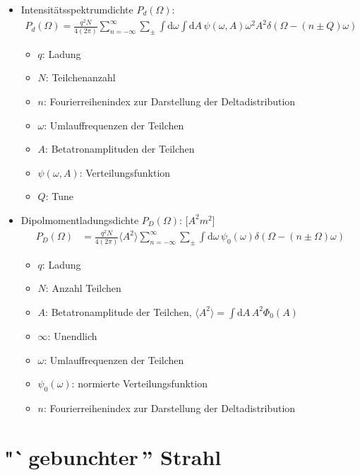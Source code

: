 \documentclass[12pt]{article}%
\begin{document}
\begin{itemize}
\item Intensitätsspektrumdichte $P_d(\Omega)$:
\begin{align}
	P_d(\Omega) =\frac{q^2N}{4(2\pi)}\sum_{n=-\infty}^{\infty}\sum_{\pm} \int \mathrm{d}\omega \int \mathrm{d}A \, \psi(\omega, A) \omega^2 A^2 \delta(\Omega - (n \pm Q)\omega)
\end{align}

	\begin{itemize}
		\item $q$: Ladung
		\item $N$: Teilchenanzahl
		\item $n$: Fourierreihenindex zur Darstellung der Deltadistribution
		\item $\omega$: Umlauffrequenzen der Teilchen
		\item $A$: Betatronamplituden der Teilchen
		\item $\psi(\omega, A)$: Verteilungsfunktion
		\item $Q$: Tune
	\end{itemize}

\item Dipolmomentladungsdichte $P_D(\Omega)$: [$A^2m^2$]
\begin{align}
P_D(\Omega) &= \frac{q^2N}{4(2\pi)} \langle A^2 \rangle \sum_{n=-\infty}^{\infty} \sum_{\pm} \int \mathrm{d}\omega \, \psi_0(\omega) \delta(\Omega - ( n \pm  \Omega) \omega)
\end{align}

	\begin{itemize}
	\item $q$: Ladung
	\item $N$: Anzahl Teilchen
	\item $A$: Betatronamplitude der Teilchen, $\langle A^2 \rangle = \int \mathrm{d}A \, A^2 \Phi_0(A)$
	\item $\infty$: Unendlich
	\item $\omega$: Umlauffrequenzen der Teilchen
	\item $\psi_0(\omega)$: normierte Verteilungsfunktion
	\item $n$: Fourierreihenindex zur Darstellung der Deltadistribution
	\end{itemize}

\end{itemize}

\section{"`\,gebunchter\,'' Strahl}
\end{document}
